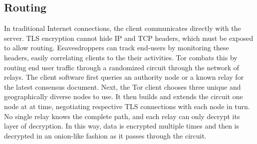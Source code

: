 \subsection{Routing}

In traditional Internet connections, the client communicates directly with the server. TLS encryption cannot hide IP and TCP headers, which must be exposed to allow routing. Eeavesdroppers can track end-users by monitoring these headers, easily correlating clients to the their activities. Tor combats this by routing end user traffic through a randomized circuit through the network of relays. The client software first queries an authority node or a known relay for the latest consensus document. Next, the Tor client chooses three unique and geographically diverse nodes to use. It then builds and extends the circuit one node at at time, negotiating respective TLS connections with each node in turn. No single relay knows the complete path, and each relay can only decrypt its layer of decryption. In this way, data is encrypted multiple times and then is decrypted in an onion-like fashion as it passes through the circuit.

